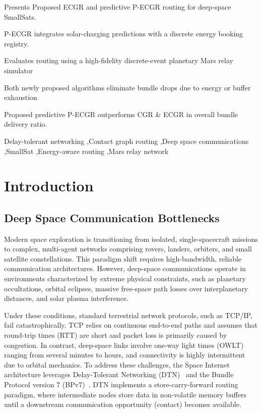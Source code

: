 \documentclass[a4paper,fleqn]{cas-dc}
\begin{document}
\begin{highlights}
  \item Presents Proposed ECGR and predictive P-ECGR routing for deep-space SmallSats.
  \item P-ECGR integrates solar-charging predictions with a discrete energy booking registry.
  \item Evaluates routing using a high-fidelity discrete-event planetary Mars relay simulator
  \item Both newly proposed algorithms eliminate bundle drops due to energy or buffer exhaustion
  \item Proposed predictive P-ECGR outperforms CGR \& ECGR in overall bundle delivery ratio.
\end{highlights}

\begin{keywords}
Delay-tolerant networking \sep Contact graph routing \sep Deep space communications \sep SmallSat \sep Energy-aware routing \sep Mars relay network
\end{keywords}

\maketitle

\section{Introduction}
\label{sec:intro}

\subsection{Deep Space Communication Bottlenecks}
Modern space exploration is transitioning from isolated, single-spacecraft missions to complex, multi-agent networks comprising rovers, landers, orbiters, and small satellite constellations. This paradigm shift requires high-bandwidth, reliable communication architectures. However, deep-space communications operate in environments characterized by extreme physical constraints, such as planetary occultations, orbital eclipses, massive free-space path losses over interplanetary distances, and solar plasma interference. 

Under these conditions, standard terrestrial network protocols, such as TCP/IP, fail catastrophically. TCP relies on continuous end-to-end paths and assumes that round-trip times (RTT) are short and packet loss is primarily caused by congestion. In contrast, deep-space links involve one-way light times (OWLT) ranging from several minutes to hours, and connectivity is highly intermittent due to orbital mechanics. To address these challenges, the Space Internet architecture leverages Delay-Tolerant Networking (DTN)~\cite{fall2003dtn,cerf2007dtn} and the Bundle Protocol version 7 (BPv7)~\cite{rfc9171}. DTN implements a store-carry-forward routing paradigm, where intermediate nodes store data in non-volatile memory buffers until a downstream communication opportunity (contact) becomes available.
\end{document}
